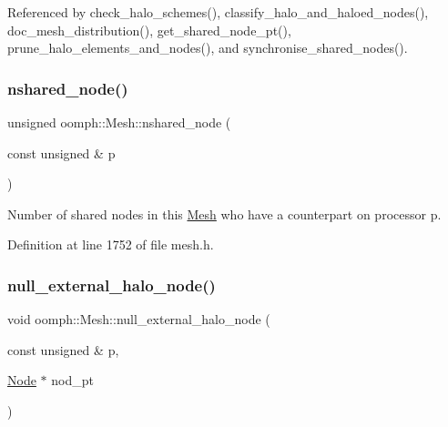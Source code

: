 Referenced by check\+\_\+halo\+\_\+schemes(), classify\+\_\+halo\+\_\+and\+\_\+haloed\+\_\+nodes(), doc\+\_\+mesh\+\_\+distribution(), get\+\_\+shared\+\_\+node\+\_\+pt(), prune\+\_\+halo\+\_\+elements\+\_\+and\+\_\+nodes(), and synchronise\+\_\+shared\+\_\+nodes().

\mbox{\label{classoomph_1_1Mesh_ad6e54ac8bf3569d6debc3de8351b8108}} 
\subsubsection{\texorpdfstring{nshared\+\_\+node()}{nshared\_node()}\hspace{0.1cm}{\footnotesize\ttfamily [2/2]}}
{\footnotesize\ttfamily unsigned oomph\+::\+Mesh\+::nshared\+\_\+node (\begin{DoxyParamCaption}\item[{const unsigned \&}]{p }\end{DoxyParamCaption})\hspace{0.3cm}{\ttfamily [inline]}}



Number of shared nodes in this \hyperlink{classoomph_1_1Mesh}{Mesh} who have a counterpart on processor p. 



Definition at line 1752 of file mesh.\+h.

\mbox{\label{classoomph_1_1Mesh_ae44a2c10b99136ec7ff3b31e67745d72}} 
\subsubsection{\texorpdfstring{null\+\_\+external\+\_\+halo\+\_\+node()}{null\_external\_halo\_node()}}
{\footnotesize\ttfamily void oomph\+::\+Mesh\+::null\+\_\+external\+\_\+halo\+\_\+node (\begin{DoxyParamCaption}\item[{const unsigned \&}]{p,  }\item[{\hyperlink{classoomph_1_1Node}{Node} $\ast$}]{nod\+\_\+pt }\end{DoxyParamCaption})}



